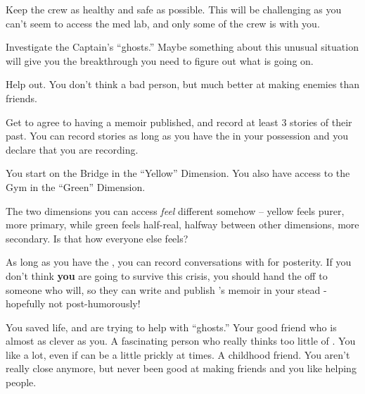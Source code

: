 \documentclass[char]{TMFHope}
\begin{document}
\begin{itemz}[Goals]
	\item Keep the crew as healthy and safe as possible. This will be challenging as you can't seem to access the med lab, and only some of the crew is with you.
	\item Investigate the Captain's ``ghosts.'' Maybe something about this unusual situation will give you the breakthrough you need to figure out what is going on.
	\item Help \cDip{} out. You don't think \cDip{\they} \cDip{\are} a bad person, but \cDip{\they} \cDip{\are} much better at making enemies than friends.
	\item Get \cEng{} to agree to having a memoir published, and record at least 3 stories of their past. You can record stories as long as you have the \iVoice{\MYname{}} in your possession and you declare that you are recording.
\end{itemz}

\begin{itemz}[Notes]
	\item You start on the Bridge in the ``Yellow'' Dimension. You also have access to the Gym in the ``Green'' Dimension. 
	\item The two dimensions you can access {\em feel} different somehow -- yellow feels purer, more primary, while green feels half-real, halfway between other dimensions, more secondary.  Is that how everyone else feels?
	\item As long as you have the \iVoice{}, you can record conversations with \cEng{} for posterity. If you don't think \textbf{you} are going to survive this crisis, you should hand the \iVoice{} off to someone who will, so they can write and publish \cEng{}'s memoir in your stead - hopefully not post-humorously!
\end{itemz}

\begin{contacts}
	\contact{\cCap{}} You saved \cCap{\their} life, and are trying to help \cCap{\them} with \cCap{\their} ``ghosts.''
	\contact{\cSci{}} Your good friend who is almost as clever as you.
	\cotact{\cEng{}} A fascinating person who really thinks too little of \cEng{\themself}. You like \cEng{} a lot, even if \cEng{\they} can be a little prickly at times.
	\contact{\cDip{}} A childhood friend. You aren't really close anymore, but \cDip{\they} \cDip{\have} never been good at making friends and you like helping people.
\end{contacts}
\end{document}
